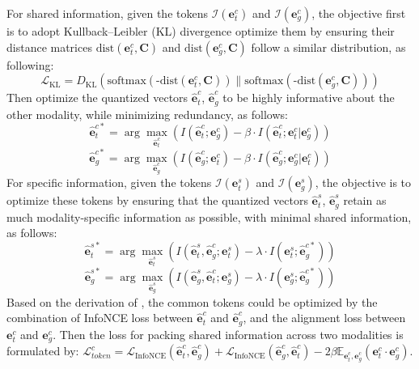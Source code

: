 For shared information, given the tokens $\mathcal{I}(\mathbf{e}_{t}^{c})$ and $\mathcal{I}(\mathbf{e}_{g}^{c})$, the objective first is to adopt Kullback–Leibler (KL) divergence optimize them by ensuring their distance matrices \(\mathrm{dist}(\mathbf{e}_{t}^{c}, \mathbf{C})\) and \(\mathrm{dist}(\mathbf{e}_{g}^{c}, \mathbf{C})\) follow a similar distribution, as following:
\begin{equation}
    \mathcal{L}_{\text{KL}} = D_{\text{KL}}(\text{softmax}(\mbox{-}\mathrm{dist}(\mathbf{e}_{t}^{c}, \mathbf{C}))\parallel\text{softmax}(\mbox{-}\mathrm{dist}(\mathbf{e}_{g}^{c}, \mathbf{C}))) \nonumber
\end{equation}
Then optimize the quantized vectors \(\mathbf{\hat{e}}_{t}^{c} \), \( \mathbf{\hat{e}}_{g}^{c} \) to be highly informative about the other modality, while minimizing redundancy, as follows:
\begin{equation}
\mathbf{\hat{e}}_{t}^{c*} = \arg\max_{\mathbf{\hat{e}}_{t}^{c}} \left( I(\mathbf{\hat{e}}_{t}^{c}; \mathbf{e}_{g}^{c}) - \beta \cdot I(\mathbf{\hat{e}}_{t}^{c}; \mathbf{e}_{t}^{c} | \mathbf{e}_{g}^{c}) \right)
\end{equation}
\begin{equation}
\mathbf{\hat{e}}_{g}^{c*} = \arg\max_{\mathbf{\hat{e}}_{g}^{c}} \left( I(\mathbf{\hat{e}}_{g}^{c}; \mathbf{e}_{t}^{c}) - \beta \cdot I(\mathbf{\hat{e}}_{g}^{c}; \mathbf{e}_{g}^{c} | \mathbf{e}_{t}^{c}) \right)
\end{equation}
%
For specific information, given the tokens $\mathcal{I}(\mathbf{e}_{t}^{s})$ and $\mathcal{I}(\mathbf{e}_{g}^{s})$, the objective is to optimize these tokens by ensuring that the quantized vectors \( \mathbf{\hat{e}}_{t}^{s} \), \( \mathbf{\hat{e}}_{g}^{s} \) retain as much modality-specific information as possible, with minimal shared information, as follows:
\begin{equation}
    \mathbf{\hat{e}}_{t}^{s*} = \arg \max_{\mathbf{\hat{e}}_{t}^{s}} \left( I(\mathbf{\hat{e}}_{t}^{s}, \mathbf{\hat{e}}_{g}^{c}; \mathbf{e}_{t}^{s}) - \lambda \cdot I(\mathbf{e}_{t}^{s}; \mathbf{\hat{e}}_{g}^{c*}) \right)
\end{equation}
\begin{equation}
    \mathbf{\hat{e}}_{g}^{s*} = \arg \max_{\mathbf{\hat{e}}_{g}^{s}} \left( I(\mathbf{\hat{e}}_{g}^{s}, \mathbf{\hat{e}}_{t}^{c}; \mathbf{e}_{g}^{s}) - \lambda \cdot I(\mathbf{e}_{g}^{s}; \mathbf{\hat{e}}_{g}^{c*}) \right)
\end{equation}
%
Based on the derivation of \cite{wang2024information}, the common tokens could be optimized by the combination of InfoNCE loss between $\mathbf{\hat{e}}_{t}^{c}$ and $\mathbf{\hat{e}}_{g}^{c}$, and the alignment loss between $\mathbf{e}_{t}^{c}$ and $\mathbf{e}_{g}^{c}$. Then the loss for packing shared information across two modalities is formulated by: $\mathcal{L}_{token}^{c} = \mathcal{L}_{\mathrm{InfoNCE}}(\mathbf{\hat{e}}_{t}^{c}, \mathbf{\hat{e}}_{g}^{c}) + \mathcal{L}_{\mathrm{InfoNCE}}(\mathbf{\hat{e}}_{g}^{c}, \mathbf{\hat{e}}_{t}^{c}) - 2\beta \mathbb{E}_{\mathbf{e}_{t}^{c}, \mathbf{e}_{g}^{c}}(\mathbf{e}_{t}^{c} \cdot \mathbf{e}_{g}^{c})$. 
